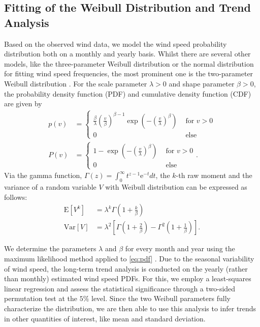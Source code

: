 \documentclass{article}
\theoremstyle{plain}
\theoremstyle{definition}
\theoremstyle{remark}
\begin{document}
\subsection{Fitting of the Weibull Distribution and Trend Analysis}\label{sec:weibull}
Based on the observed wind data, we model the wind speed probability distribution both on a monthly
and yearly basis.  Whilst there are several other models, like the three-parameter Weibull
distribution or the normal distribution for fitting wind speed frequencies, the most prominent one
is the two-parameter Weibull distribution \cite{review, statanalysis, mohammadi2016assessing}.  For
the scale parameter $\lambda >0$ and shape parameter $\beta >0$, the probability density function
(PDF) and cumulative density function (CDF) are given by
\begin{align}
    \label{eq:pdf}
    p(v) &=
    \begin{cases}
        \frac{\beta}{\lambda} \left( \frac{v}{\beta}\right)^{\beta-1} 
        \exp{ \left( -\left(\frac{v}{\lambda}\right)^\beta \right)} & \text{  for } v>0 \\
        0 & \text{ else}
    \end{cases} \\
    \label{eq:cdf}
    P(v)&=
    \begin{cases}
        1- \exp{\left(-\left(\frac{v}{\lambda}\right)^\beta \right)} & \text{  for } v>0 \\
        0 & \text{ else}
    \end{cases}.
\end{align}
Via the gamma function, $\Gamma(z)= \int_{0}^{\infty}t^{z-1} \mathrm{e}^{-t}dt$, 
the $k$-th raw moment and the variance of a random variable $V$ with Weibull distribution can be expressed as follows: 
\begin{align}  
    \mathrm{E}[V^k] &= \lambda^k \Gamma \left( 1 + \frac{k}{\beta} \right) \label{eq:n-raw-moment} \\
    \mathrm{Var}[V] &= \lambda^2 \left[  \Gamma \left( 1 + \frac{2}{\beta}\right) \label{eq:var}
    - \Gamma^2 \left( 1 + \frac{1}{\beta}\right)\right].
\end{align}

We determine the parameters $\lambda$ and $\beta$ for every month and year using the maximum
likelihood method applied to \eqref{eq:pdf} \cite{mohammadi2016assessing}.  Due to the seasonal
variability of wind speed, the long-term trend analysis is conducted on the yearly (rather than
monthly) estimated wind speed PDFs. For this, we employ a least-squares linear regression and assess
the statistical significance through a two-sided permutation test at the $5\%$ level.  Since the two
Weibull parameters fully characterize the distribution, we are then able to use this analysis to
infer trends in other quantities of interest, like mean and standard deviation.
\end{document}
